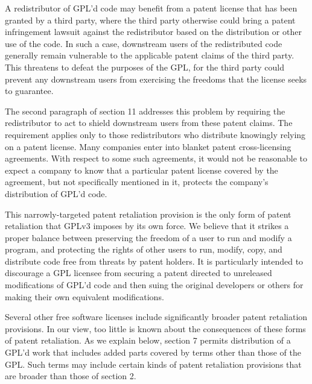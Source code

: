 
A redistributor of GPL'd code may benefit from a patent license that has been
granted by a third party, where the third party otherwise could bring a
patent infringement lawsuit against the redistributor based on the
distribution or other use of the code. In such a case, downstream users of
the redistributed code generally remain vulnerable to the applicable patent
claims of the third party. This threatens to defeat the purposes of the GPL,
for the third party could prevent any downstream users from exercising the
freedoms that the license seeks to guarantee.


The second paragraph of section 11 addresses this problem by requiring the
redistributor to act to shield downstream users from these patent claims. The
requirement applies only to those redistributors who distribute knowingly
relying on a patent license. Many companies enter into blanket patent
cross-licensing agreements. With respect to some such agreements, it would
not be reasonable to expect a company to know that a particular patent
license covered by the agreement, but not specifically mentioned in it,
protects the company's distribution of GPL'd code.


This narrowly-targeted patent retaliation provision is the only form of
patent retaliation that GPLv3 imposes by its own force. We believe that it
strikes a proper balance between preserving the freedom of a user to run and
modify a program, and protecting the rights of other users to run, modify,
copy, and distribute code free from threats by patent holders. It is
particularly intended to discourage a GPL licensee from securing a patent
directed to unreleased modifications of GPL'd code and then suing the
original developers or others for making their own equivalent modifications.

Several other free software licenses include significantly broader patent
retaliation provisions. In our view, too little is known about the
consequences of these forms of patent retaliation. As we explain below,
section 7 permits distribution of a GPL'd work that includes added parts
covered by terms other than those of the GPL. Such terms may include certain
kinds of patent retaliation provisions that are broader than those of section
2.

